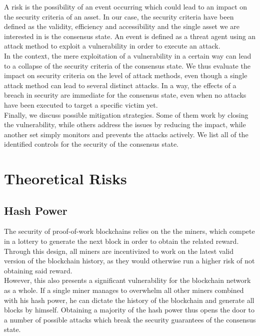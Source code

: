 \documentclass[11pt,a4paper,draft]{article}
\begin{document}
A risk is the possibility of an event occurring which could lead to an impact on the security criteria of an asset. In our case, the security criteria have been defined as the validity, efficiency and accessibility and the single asset we are interested in is the consensus state. An event is defined as a threat agent using an attack method to exploit a vulnerability in order to execute an attack.\\

In the context, the mere exploitation of a vulnerability in a certain way can lead to a collapse of the security criteria of the consensus state. We thus evaluate the impact on security criteria on the level of attack methods, even though a single attack method can lead to several distinct attacks. In a way, the effects of a breach in security are immediate for the consensus state, even when no attacks have been executed to target a specific victim yet.\\

Finally, we discuss possible mitigation strategies. Some of them work by closing the vulnerability, while others address the issues by reducing the impact, while another set simply monitors and prevents the attacks actively. We list all of the identified controls for the security of the consensus state.\\

\section{Theoretical Risks}

\subsection{Hash Power}

The security of proof-of-work blockchains relies on the the miners, which compete in a lottery to generate the next block in order to obtain the related reward. Through this design, all miners are incentivized to work on the latest valid version of the blockchain history, as they would otherwise run a higher risk of not obtaining said reward.\\

However, this also presents a significant vulnerability for the blockchain network as a whole. If a single miner manages to overwhelm all other miners combined with his hash power, he can dictate the history of the blockchain and generate all blocks by himself. Obtaining a majority of the hash power thus opens the door to a number of possible attacks which break the security guarantees of the consensus state.\\
\end{document}
